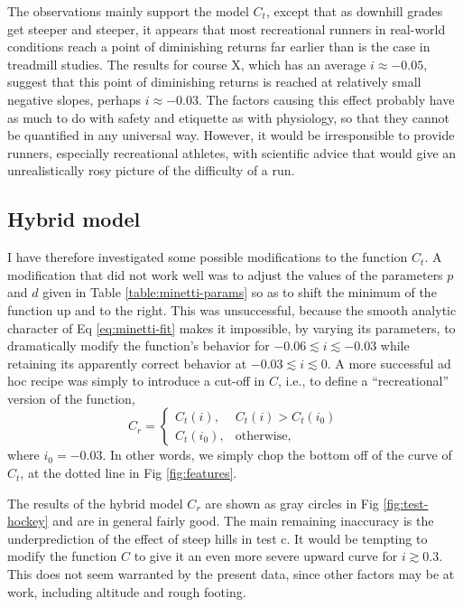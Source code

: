 \documentclass[10pt,letterpaper]{article}
\begin{document}
The observations mainly support the model $C_t$, except that as
downhill grades get steeper and steeper, it appears that most
recreational runners in real-world conditions reach a point of
diminishing returns far earlier than is the case in treadmill studies.
The results for course X, which has an average $i\approx -0.05$,
suggest that this point of diminishing returns is reached at relatively
small negative slopes, perhaps $i\approx -0.03$.
The factors causing this effect probably have as much to do with safety and etiquette as
with physiology, so that they cannot be quantified in any
universal way. However, it would be irresponsible to provide runners,
especially recreational athletes, with scientific advice that would
give an unrealistically rosy picture of the difficulty of a run.

\subsection{Hybrid model}\label{sec:hybrid}

I have therefore investigated some possible modifications to the function
$C_t$. A modification that did not work well was to adjust the values of the parameters $p$ and $d$
given in Table \ref{table:minetti-params} so as to shift the minimum of
the function up and to the right. This was unsuccessful, because the smooth
analytic character of Eq \eqref{eq:minetti-fit} makes it impossible, by varying its parameters, to 
dramatically modify the function's behavior for $-0.06\lesssim i \lesssim -0.03$
while retaining its apparently correct behavior at $-0.03 \lesssim i \lesssim 0$.
A more successful ad hoc recipe was simply to introduce a cut-off in $C$, i.e.,
to define a ``recreational'' version of the function,
\begin{equation}\label{eq:rec}
  C_r =   \begin{cases}
     C_t(i), & C_t(i)>C_t(i_0) \\
     C_t(i_0), & \text{otherwise},
  \end{cases}
\end{equation}
where $i_0=-0.03$.
In other words, we simply chop the bottom off of the curve of $C_t$, at the dotted
line in Fig \ref{fig:features}.

The results of the hybrid model $C_r$ are shown as gray circles in Fig \ref{fig:test-hockey}
and are in general fairly good. The main remaining inaccuracy is the underprediction of the
effect of steep hills in test c. It would be tempting to modify the function $C$ to give it
an even more severe upward curve for $i\gtrsim 0.3$. This does not seem warranted by the present
data, since other factors may be at work, including altitude and rough footing.
\end{document}
